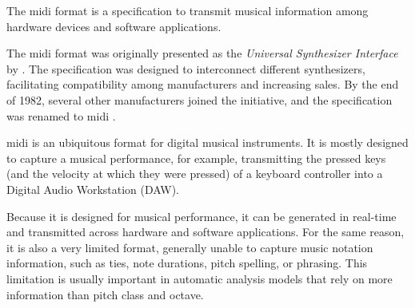 


The \gls{midi} format is a
specification to transmit musical information among hardware
devices and software applications.

The \gls{midi} format was originally presented as the
\emph{Universal Synthesizer Interface} by
\textcite{smith1981usi}. The specification was
designed to interconnect different synthesizers,
facilitating compatibility among manufacturers and
increasing sales. By the end of 1982, several other
manufacturers joined the initiative, and the specification
was renamed to \gls{midi} \parencite{moog1986midi}.


\gls{midi} is an ubiquitous format for digital musical instruments. It is mostly designed to capture a musical performance, for example, transmitting the pressed keys (and the velocity at which they were pressed) of a keyboard controller into a Digital Audio Workstation (DAW).

Because it is designed for musical performance, it can be generated in real-time and transmitted across hardware and software applications. For the same reason, it is also a very limited format, generally unable to capture music notation information, such as ties, note durations, pitch spelling, or phrasing. This limitation is usually important in automatic analysis models that rely on more information than pitch class and octave.


